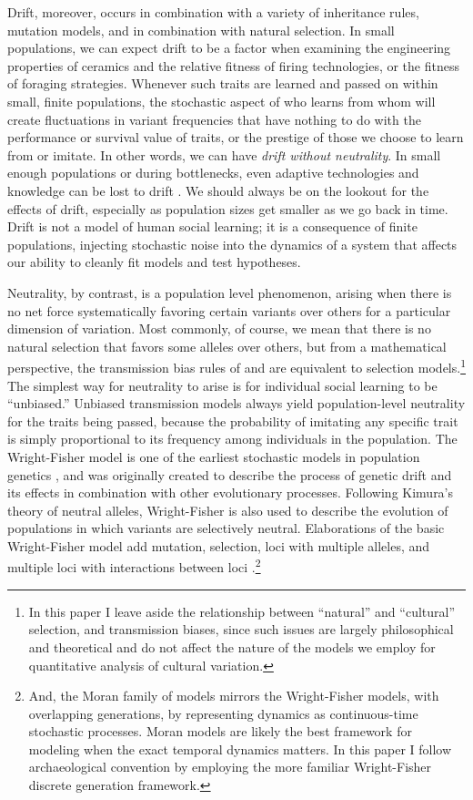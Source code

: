 Drift, moreover, occurs in combination with a variety of inheritance rules, mutation models, and in combination with natural selection.  In small populations, we can expect drift to be a factor when examining the engineering properties of ceramics and the relative fitness of firing technologies, or the fitness of foraging strategies.  Whenever such traits are learned and passed on within small, finite populations, the stochastic aspect of who learns from whom will create fluctuations in variant frequencies that have nothing to do with the performance or survival value of traits, or the prestige of those we choose to learn from or imitate.  In other words, we can have \emph{drift without neutrality}.  In small enough populations or during bottlenecks, even adaptive technologies and knowledge can be lost to drift \citep{8921,henrich2006understanding}.  We should always be on the lookout for the effects of drift, especially as population sizes get smaller as we go back in time.  Drift is not a model of human social learning; it is a consequence of finite populations, injecting stochastic noise into the dynamics of a system that affects our ability to cleanly fit models and test hypotheses.  

Neutrality, by contrast, is a population level phenomenon, arising when there is no net force systematically favoring certain variants over others for a particular dimension of variation.  Most commonly, of course, we mean that there is no natural selection that favors some alleles over others, but from a mathematical perspective, the transmission bias rules of  \citet{CF1981} and \citet{BR1985} are equivalent to selection models.\footnote{In this paper I leave aside the relationship between ``natural'' and ``cultural'' selection, and transmission biases, since such issues are largely philosophical and theoretical and do not affect the nature of the models we employ for quantitative analysis of cultural variation.}   The simplest way for neutrality to arise is for individual social learning to be ``unbiased.''  Unbiased transmission models always yield population-level neutrality for the traits being passed, because the probability of imitating any specific trait is simply proportional to its frequency among individuals in the population.  The Wright-Fisher model is one of the earliest stochastic models in population genetics \citep{provine1989sewall,provine2001origins,wright1931evolution}, and was originally created to describe the process of genetic drift and its effects in combination with other evolutionary processes.  Following Kimura's theory of neutral alleles, Wright-Fisher is also used to describe the evolution of populations in which variants are selectively neutral.  Elaborations of the basic Wright-Fisher model add mutation, selection, loci with multiple alleles, and multiple loci with interactions between loci \citep[see esp.][]{crow1970introduction,Ewens2004}.\footnote{And, the Moran family of models mirrors the Wright-Fisher models, with overlapping generations, by representing dynamics as continuous-time stochastic processes.  Moran models are likely the best framework for modeling \ct when the exact temporal dynamics matters.  In this paper I follow archaeological convention by employing the more familiar Wright-Fisher discrete generation framework.}
 
